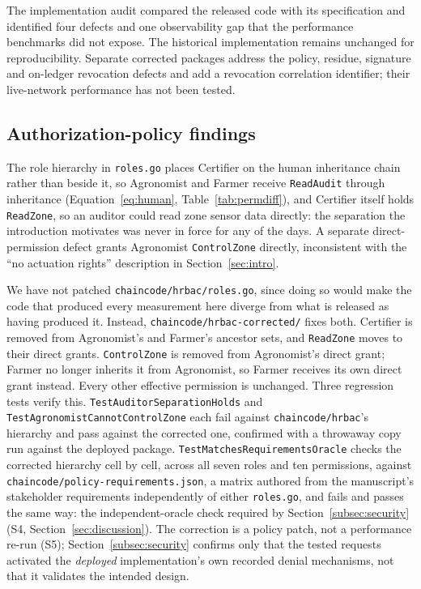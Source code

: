 \documentclass[a4paper,fleqn]{cas-dc}
\begin{document}
The implementation audit compared the released code with its specification
and identified four defects and one observability gap that the performance
benchmarks did not expose. The historical implementation remains unchanged
for reproducibility. Separate corrected packages address the policy,
residue, signature and on-ledger revocation defects and add a revocation
correlation identifier; their live-network performance has not been tested.

\subsection{Authorization-policy findings}
\label{subsec:pm_policy}

The role hierarchy in \texttt{roles.go} places Certifier on the human
inheritance chain rather than beside it, so Agronomist and Farmer receive
\texttt{ReadAudit} through inheritance (Equation~\eqref{eq:human},
Table~\ref{tab:permdiff}), and Certifier itself holds \texttt{ReadZone}, so
an auditor could read zone sensor data directly: the separation the
introduction motivates was never in force for any of the \DeployDays{}
days. A separate direct-permission defect grants Agronomist
\texttt{ControlZone} directly, inconsistent with the ``no actuation
rights'' description in Section~\ref{sec:intro}.

We have not patched \texttt{chaincode/hrbac/roles.go}, since doing so
would make the code that produced every measurement here diverge from
what is released as having produced it. Instead,
\texttt{chaincode/hrbac-corrected/} fixes both. Certifier is removed from
Agronomist's and Farmer's ancestor sets, and \texttt{ReadZone} moves to
their direct grants. \texttt{ControlZone} is removed from Agronomist's
direct grant; Farmer no longer inherits it from Agronomist, so Farmer
receives its own direct grant instead. Every other effective permission is
unchanged. Three regression tests verify this.
\texttt{TestAuditorSeparationHolds} and
\texttt{TestAgronomistCannotControlZone} each fail against
\texttt{chaincode/hrbac}'s hierarchy and pass against the corrected one,
confirmed with a throwaway copy run against the deployed package.
\texttt{TestMatchesRequirementsOracle} checks the corrected hierarchy cell
by cell, across all seven roles and ten permissions, against
\texttt{chaincode/policy-requirements.json}, a matrix authored from the
manuscript's stakeholder requirements independently of either
\texttt{roles.go}, and fails and passes the same way: the independent-oracle
check required by Section~\ref{subsec:security} (S4,
Section~\ref{sec:discussion}). The correction is a policy patch, not a
performance re-run (S5); Section~\ref{subsec:security} confirms only that
the tested requests activated the \emph{deployed} implementation's own
recorded denial mechanisms, not that it validates the intended design.
\end{document}
